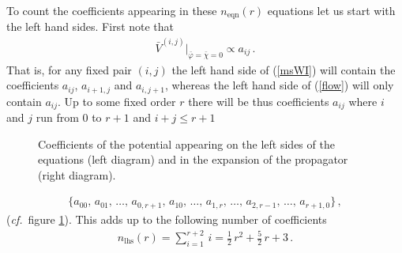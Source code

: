 \documentclass[11pt]{book} %
\newcommand\cf{\textit{cf.}\ }
\numberwithin{equation}{chapter}
\begin{document}
To count the coefficients appearing in these $n_{\text{eqn}}(r)$ equations let us start with the left hand sides.
First note that
\begin{align}
  \label{proportionality}
  \bar V^{(i,j)} \bigg|_{\bar\varphi = \bar\chi = 0}
  \propto a_{ij} \,.
\end{align}
That is, for any fixed pair $(i,j)$ the left hand side of (\ref{msWI}) will contain the coefficients
$a_{ij}$, $a_{i+1,j}$ and $a_{i,j+1}$, whereas the left hand side of (\ref{flow}) will only contain $a_{ij}$.
Up to some fixed order $r$ there will be thus coefficients $a_{ij}$ where $i$ and $j$ run from
$0$ to $r+1$ and $i+j \leqslant r+1$
\begin{figure}
  \begin{center}
    
    
  \end{center}
  \caption{
    Coefficients of the potential appearing on the left sides of the equations (left diagram)
    and in the expansion of the propagator (right diagram).
  }
  \label{fig:diag_lhs_rhs}
\end{figure}
\begin{align}
  \label{coeff_lhs}
  \bigg\lbrace
  a_{00},\, a_{01},\, \dots ,\, a_{0,r+1},\, a_{10},\, \dots ,\,
  a_{1,r},\, \dots ,\, a_{2,r-1},\, \dots,\, a_{r+1,0}
  \bigg\rbrace \,,
\end{align}
(\cf figure \ref{fig:diag_lhs_rhs}). This adds up to the following number of coefficients
\begin{align}
  n_{\text{lhs}}(r) = \sum_{i=1}^{r+2} \, i = \frac{1}{2} \, r^2 + \frac{5}{2} \, r + 3 \,.
\end{align}
\end{document}
